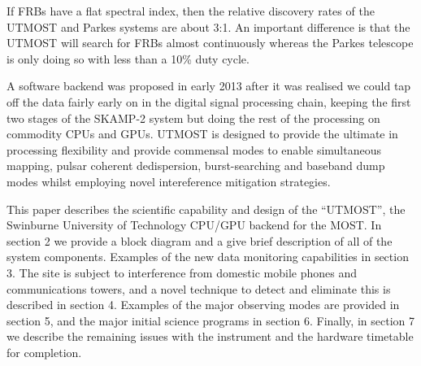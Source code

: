 If FRBs have a flat spectral index, then the relative discovery rates of the UTMOST and Parkes systems are about 3:1. An important difference is that the UTMOST will search for FRBs almost continuously whereas the Parkes telescope is only doing so with less than a 10\% duty cycle.

A software backend was proposed in early 2013 after it was realised we could tap off the data fairly early on in the digital signal processing chain, keeping the first two stages of the SKAMP-2 system but doing the rest of the processing on commodity CPUs and GPUs. UTMOST is designed to provide the ultimate in processing flexibility and provide commensal modes to enable simultaneous mapping, pulsar coherent dedispersion, burst-searching and baseband dump modes whilst employing novel intereference mitigation strategies.

This paper describes the scientific capability and design of the ``UTMOST'', the Swinburne University of Technology CPU/GPU backend for the MOST. In section 2 we provide a block diagram and a give brief description of all of the system components. Examples of the new data monitoring capabilities in section 3. The site is subject to interference from domestic mobile phones and communications towers, and a novel technique to detect and eliminate this is described in section 4. Examples of the major observing modes are provided in section 5, and the major initial science programs in section 6. Finally, in section 7 we describe the remaining issues with the instrument and the hardware timetable for completion.



